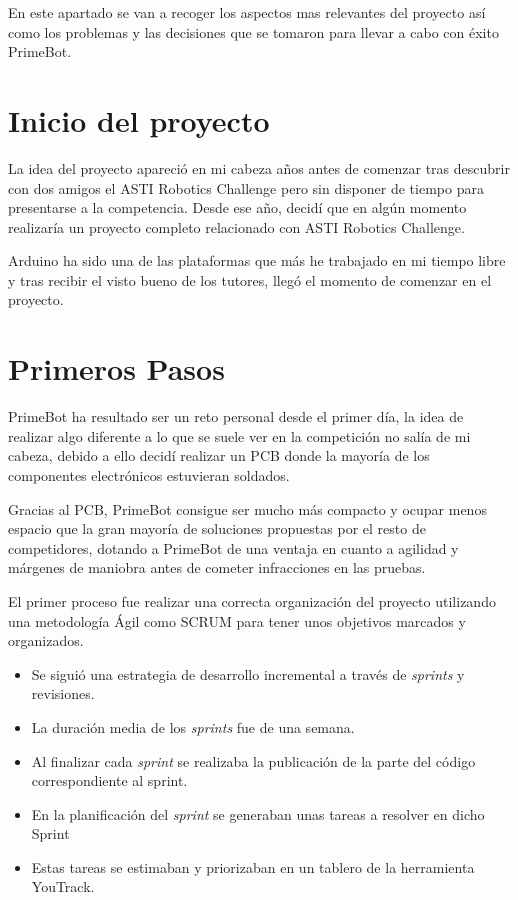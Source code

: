
En este apartado se van a recoger los aspectos mas relevantes del proyecto así como los problemas y las decisiones que se tomaron para llevar a cabo con éxito PrimeBot.

\section{Inicio del proyecto}\label{inicio-del-proyecto}

La idea del proyecto apareció en mi cabeza años antes de comenzar tras descubrir con dos amigos el ASTI Robotics Challenge pero sin disponer de tiempo para presentarse a la competencia.
Desde ese año, decidí que en algún momento realizaría un proyecto completo relacionado con ASTI Robotics Challenge.

Arduino ha sido una de las plataformas que más he trabajado en mi tiempo libre y tras recibir el visto bueno de los tutores, llegó el momento de comenzar en el proyecto.

\section{Primeros Pasos}\label{primeros-pasos}

PrimeBot ha resultado ser un reto personal desde el primer día, la idea de realizar algo diferente a lo que se suele ver en la competición no salía de mi cabeza, debido a ello decidí realizar un PCB donde la mayoría de los componentes electrónicos estuvieran soldados.

Gracias al PCB, PrimeBot consigue ser mucho más compacto y ocupar menos espacio que la gran mayoría de soluciones propuestas por el resto de competidores, dotando a PrimeBot de una ventaja en cuanto a agilidad y márgenes de maniobra antes de cometer infracciones en las pruebas.

El primer proceso fue realizar una correcta organización del proyecto utilizando una metodología Ágil como SCRUM para tener unos objetivos marcados y organizados.

\begin{itemize}
\tightlist
\item
  Se siguió una estrategia de desarrollo incremental a través de \emph{sprints} y revisiones.
\item
  La duración media de los \emph{sprints} fue de una semana.
\item
  Al finalizar cada \emph{sprint} se realizaba la publicación de la parte del código correspondiente al sprint.
\item
  En la planificación del \emph{sprint} se generaban unas tareas a resolver en dicho Sprint
\item
  Estas tareas se estimaban y priorizaban en un tablero de la herramienta YouTrack.
\end{itemize}

